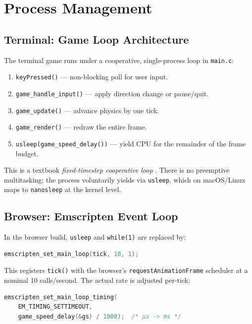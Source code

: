 \documentclass[conference]{IEEEtran}
\begin{document}
\section{Process Management}

\subsection{Terminal: Game Loop Architecture}

The terminal game runs under a cooperative, single-process loop in
\texttt{main.c}:

\begin{enumerate}
  \item \texttt{keyPressed()} --- non-blocking poll for user input.
  \item \texttt{game\_handle\_input()} --- apply direction change or pause/quit.
  \item \texttt{game\_update()} --- advance physics by one tick.
  \item \texttt{game\_render()} --- redraw the entire frame.
  \item \texttt{usleep(game\_speed\_delay())} --- yield CPU for the remainder
        of the frame budget.
\end{enumerate}

This is a textbook \emph{fixed-timestep cooperative loop} \cite{gregory2018game}.
There is no preemptive multitasking; the process voluntarily yields via
\texttt{usleep}, which on macOS/Linux maps to \texttt{nanosleep} at the kernel
level.

\subsection{Browser: Emscripten Event Loop}

In the browser build, \texttt{usleep} and \texttt{while(1)} are replaced by:

\begin{lstlisting}[language=C]
emscripten_set_main_loop(tick, 10, 1);
\end{lstlisting}

This registers \texttt{tick()} with the browser's \texttt{requestAnimationFrame}
scheduler at a nominal 10 calls/second. The actual rate is adjusted per-tick:

\begin{lstlisting}[language=C]
emscripten_set_main_loop_timing(
    EM_TIMING_SETTIMEOUT,
    game_speed_delay(&gs) / 1000);  /* µs -> ms */
\end{lstlisting}
\end{document}
